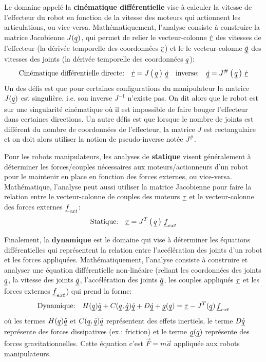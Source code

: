 Le domaine appelé la \textbf{cinématique différentielle} vise à calculer la vitesse de l'effecteur du robot en fonction de la vitesse des moteurs qui actionnent les articulations, ou vice-versa. Mathématiquement, l'analyse consiste à construire la matrice Jacobienne $J(\underline{q})$, qui permet de relier le vecteur-colonne $\underline{\dot{r}}$ des vitesses de l'effecteur (la dérivée temporelle des coordonnées $\underline{r}$) et le le vecteur-colonne $\underline{\dot{q}}$ des vitesses des joints (la dérivée temporelle des coordonnées $\underline{q}$):
\begin{equation}
\text{Cinématique différentielle directe:} \quad \underline{\dot{r}} = J\left( \, \underline{q} \, \right) \, \underline{\dot{q}}   \quad \text{inverse:} \quad \underline{\dot{q}} = J^{\#}\left( \, \underline{q} \, \right) \, \underline{\dot{r}}
\end{equation}
Un des défis est que pour certaines configurations du manipulateur la matrice $J(\underline{q})$ est singulière, i.e. son inverse $J^{-1}$ n'existe pas. On dit alors que le robot est sur une singularité cinématique où il est impossible de faire bouger l'effecteur dans certaines directions. Un autre défis est que lorsque le nombre de joints est différent du nombre de coordonnées de l'effecteur, la matrice $J$ est rectangulaire et on doit alors utiliser la notion de pseudo-inverse notée $J^{\#}$.

Pour les robots manipulateurs, les analyses de \textbf{statique} visent généralement à déterminer les forces/couples nécessaires aux moteurs/actionneurs d'un robot pour le maintenir en place en fonction des forces externes, ou vice-versa. Mathématique, l'analyse peut aussi utiliser la matrice Jacobienne pour faire la relation entre le vecteur-colonne de couples des moteurs $\underline{\tau}$ et le vecteur-colonne des forces externes $\underline{f}_{ext}$:
\begin{equation}
\text{Statique:} \quad \underline{\tau} = J^T\left( \, \underline{q} \, \right) \, \underline{f}_{ext}   
\end{equation}

Finalement, la \textbf{dynamique} est le domaine qui vise à déterminer les équations différentielles qui représentent la relation entre l'accélération des joints d'un robot et les forces appliquées. Mathématiquement, l'analyse consiste à construire et analyser une équation différentielle non-linéaire (reliant les coordonnées des joints $\underline{q}$, la vitesse des joints $\underline{\dot{q}}$, l'accélération des joints $\underline{\ddot{q}}$, les couples appliqués $\underline{\tau}$ et les forces externes $\underline{f}_{ext}$) qui prend la forme:
\begin{align}
\text{Dynamique:} \quad H(\underline{q}) \underline{\ddot{q}} + C(\underline{q},\underline{\dot{q}}) \underline{\dot{q}} + D \underline{\dot{q}} + \underline{g}(\underline{q}) = \underline{\tau} - J^T(\underline{q}) \, \underline{f}_{ext}   
\label{eq:manipulator}
\end{align}
où les termes $H(\underline{q}) \underline{\ddot{q}}$ et $C(\underline{q},\underline{\dot{q}}) \underline{\dot{q}}$ représentent des effets inertiels, le terme $D \underline{\dot{q}}$ représente des forces dissipatives (ex.: friction) et le terme $\underline{g}(\underline{q})$ représente des forces gravitationnelles. Cette équation c'est $\vec{F}=m\vec{a}$ appliquée aux robots manipulateurs. 


